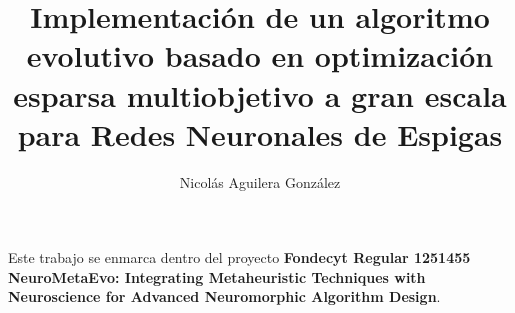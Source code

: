 \documentclass[dosguias,openany]{tesisusach}
\title{Implementación de un algoritmo evolutivo basado en optimización esparsa multiobjetivo a gran escala para Redes Neuronales de Espigas}
\author{Nicolás Aguilera González}
\date{\the\year}
\begin{document}
	\maketitle
	\frontmatter
	

	\newpage
    Este trabajo se enmarca dentro del proyecto \textbf{Fondecyt Regular 1251455 NeuroMetaEvo: Integrating Metaheuristic Techniques with Neuroscience for Advanced Neuromorphic Algorithm Design}.
\end{document}
